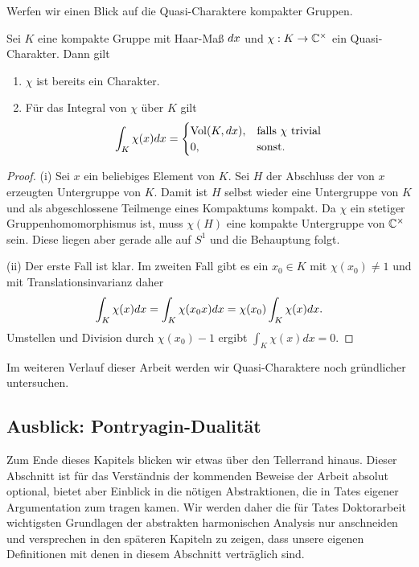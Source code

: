 	Werfen wir einen Blick auf die Quasi-Charaktere kompakter Gruppen.
	\begin{lemma}\label{Lemma:trivialerCharAufKompakt}
		Sei $K$ eine kompakte Gruppe mit Haar-Maß $d{x}$ und $\chi: K \to \mathbb{C}^\times$ ein Quasi-Charakter. Dann gilt
		\begin{enumerate}[label=(\roman*)]
				\item $\chi$ ist bereits ein Charakter.
				\item Für das Integral von $\chi$ über $K$ gilt
					\begin{align*}
						\int_K \chi(x) d{x} = 
							\begin{cases}
								\operatorname{Vol}(K, d{x}),	& \text{falls } \chi \text{ trivial}\\
								0,					& \text{sonst.}
							\end{cases}
					\end{align*}
		\end{enumerate}
	\end{lemma}
	\begin{proof}
		(i) Sei $x$ ein beliebiges Element von $K$. 
		Sei $H$ der Abschluss der von $x$ erzeugten Untergruppe von $K$.
		Damit ist $H$ selbst wieder eine Untergruppe von $K$ und als abgeschlossene Teilmenge eines Kompaktums kompakt.
		Da $\chi$ ein stetiger Gruppenhomomorphismus ist, muss $\chi(H)$ eine kompakte Untergruppe von $\mathbb{C}^\times$ sein.
		Diese liegen aber gerade alle auf $S^1$ und die Behauptung folgt.
		
		(ii) Der erste Fall ist klar. 
		Im zweiten Fall gibt es ein $x_0 \in K$ mit $\chi(x_0) \not=1$ und mit Translationsinvarianz daher
		\begin{align*}
			\int_K \chi(x)d{x} = \int_K\chi(x_0x)d{x} = \chi(x_0)\int_K\chi(x)d{x}.
		\end{align*}
		Umstellen und Division durch $\chi(x_0) - 1$ ergibt $\int_K \chi(x)dx = 0$.
	\end{proof}
	Im weiteren Verlauf dieser Arbeit werden wir Quasi-Charaktere noch gründlicher untersuchen.
	
\subsection{Ausblick: Pontryagin-Dualität}
	Zum Ende dieses Kapitels blicken wir etwas über den Tellerrand hinaus.
	Dieser Abschnitt ist für das Verständnis der kommenden Beweise der Arbeit absolut optional, bietet aber Einblick in die nötigen Abstraktionen, die in Tates eigener Argumentation zum tragen kamen.
	Wir werden daher die für Tates Doktorarbeit wichtigsten Grundlagen der abstrakten harmonischen Analysis nur anschneiden und versprechen in den späteren Kapiteln zu zeigen, dass unsere eigenen Definitionen mit denen in diesem Abschnitt verträglich sind.
	
